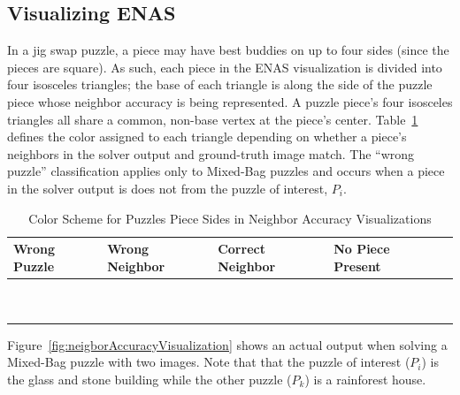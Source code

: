 \subsection{Visualizing ENAS}\label{sec:visualizingNeighborAccuracy}

In a jig swap puzzle, a piece may have best buddies on up to four sides (since the pieces are square).  As such, each piece in the ENAS visualization is divided into four isosceles triangles; the base of each triangle is along the side of the puzzle piece whose neighbor accuracy is being represented.  A puzzle piece's four isosceles triangles all share a common, non-base vertex at the piece's center.  Table~\ref{tab:neighborAccuracyColors} defines the color assigned to each triangle depending on whether a piece's neighbors in the solver output and ground-truth image match.  The ``wrong puzzle'' classification applies only to Mixed-Bag puzzles and occurs when a piece in the solver output is does not from the puzzle of interest, $P_i$. 

\begin{table}[t]
\begin{center}
  \begin{tabular}{ | >{\centering\arraybackslash}m{0.9in} | >{\centering\arraybackslash}m{0.9in} | >{\centering\arraybackslash}m{0.9in} | >{\centering\arraybackslash}m{0.9in} | >{\centering\arraybackslash}m{0.9in} | }
 \hline
    Wrong Puzzle & Wrong Neighbor & Correct Neighbor  & No Piece Present  \\ \hline
	{\cellcolor{blue}~} & {\cellcolor{red}~} & {\cellcolor{green}~} & {\cellcolor{black}~}  \\
	{\cellcolor{blue}~} & {\cellcolor{red}~} & {\cellcolor{green}~} & {\cellcolor{black}~}  \\
 \hline
  \end{tabular}
\end{center}
\caption{Color Scheme for Puzzles Piece Sides in Neighbor Accuracy Visualizations}\label{tab:neighborAccuracyColors}
\end{table}

Figure~\ref{fig:neigborAccuracyVisualization} shows an actual output when solving a Mixed-Bag puzzle with two images.  Note that that the puzzle of interest ($P_i$) is the glass and stone building while the other puzzle ($P_k$) is a rainforest house.

